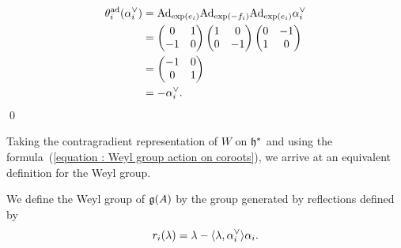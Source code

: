\begin{equation}
    \begin{split}
        \theta^{\text{ad}}_i(\alpha^{\vee}_i) & = \text{Ad}_{\exp(e_i)}\text{Ad}_{\exp(-f_i)}\text{Ad}_{\exp(e_i)}\alpha^{\vee}_i\\
        &= \begin{pmatrix}
            0&1\\-1&0
        \end{pmatrix}
        \begin{pmatrix}
            1&0\\0&-1
        \end{pmatrix}
        \begin{pmatrix}
            0&-1\\1&0
        \end{pmatrix}\\
        &=\begin{pmatrix}
            -1&0\\0&1
        \end{pmatrix}\\
        &=-\alpha^{\vee}_i.
    \end{split}
\end{equation}
\qed

Taking the contragradient representation of $W$ on $\mathfrak{h}^*$ and using the 
formula~(\ref{equation : Weyl group action on coroots}), we arrive at an equivalent definition for the Weyl group.

\begin{dang}
\begin{definition}\label{definition: Weyl group on roots}
    We define the Weyl group of $\mathfrak{g}(A)$ by the group generated by reflections defined by 
    \begin{equation}
        r_i(\lambda) = \lambda - \langle\lambda, \alpha^{\vee}_i \rangle\alpha_i.
    \end{equation}
\end{definition}
\end{dang}

